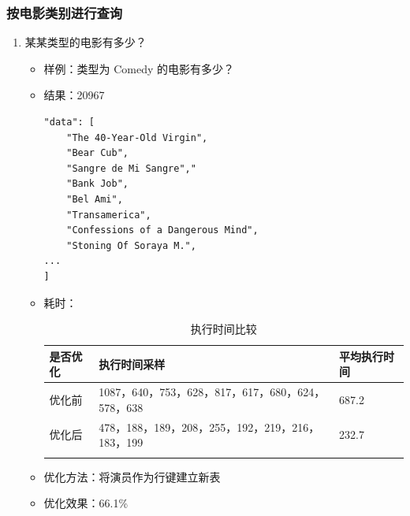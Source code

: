 \documentclass{ctexrep}
\begin{document}
		\subsubsection{按电影类别进行查询}
	    \begin{enumerate}
	        \item 某某类型的电影有多少？
    	        \begin{itemize}
    	            \item 样例：类型为 Comedy 的电影有多少？
    	            \item 结果：20967
    	             \begin{lstlisting}
"data": [
	"The 40-Year-Old Virgin",
	"Bear Cub",
	"Sangre de Mi Sangre","
	"Bank Job",
	"Bel Ami",
	"Transamerica",
	"Confessions of a Dangerous Mind",
	"Stoning Of Soraya M.",
...
]
					\end{lstlisting}
					\item 耗时：
					\begin{longtable}{l|p{5cm}|l}
						\hline
						是否优化 & 执行时间采样 & 平均执行时间\\
						\hline
						\hline
						优化前 & 1087，640，753，628，817，617，680，624，578，638& 687.2\\
						优化后 &478，188，189，208，255，192，219，216，183，199 & 232.7\\
						\hline
						\caption{执行时间比较}
					\end{longtable}
					\item 优化方法：将演员作为行键建立新表
					\item 优化效果：66.1\%
				\end{itemize}
		\end{enumerate}
\end{document}
